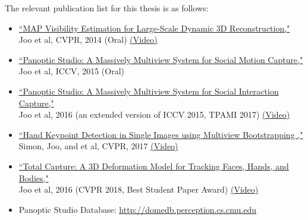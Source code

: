 The relevant publication list for this thesis is as follows: 
\begin{itemize}
	\item  \noindent \href{http://www.cs.cmu.edu/~hanbyulj/14/CVPR_2014_Visibility.pdf}{``MAP Visibility Estimation for Large-Scale Dynamic 3D Reconstruction,"}\\ 
Joo et al, CVPR, 2014 (Oral) \href{https://www.youtube.com/watch?v=LaHTjBWago8}{(Video)}

\item \noindent \href{http://www.cs.cmu.edu/~hanbyulj/panoptic-studio/ICCV2015_SMC.pdf}{``Panoptic Studio: A Massively Multiview System for Social Motion Capture,"}\\ 
Joo et al, ICCV, 2015 (Oral) 

\item \noindent \href{https://ieeexplore.ieee.org/document/8187699}{``Panoptic Studio: A Massively Multiview System for Social Interaction Capture,"}\\ 
Joo et al, 2016 (an extended version of ICCV 2015, TPAMI 2017) \href{https://www.youtube.com/watch?v=m0-7HnWvxG4}{(Video)}

\item \noindent \href{https://arxiv.org/abs/1704.07809}{``Hand Keypoint Detection in Single Images using Multiview Bootstrapping ,"}\\ 
Simon, Joo, and et al, CVPR, 2017 \href{https://www.youtube.com/watch?v=Lajt6vS_dSM}{(Video)}	

\item \noindent \href{http://openaccess.thecvf.com/content_cvpr_2018/papers/Joo_Total_Capture_A_CVPR_2018_paper.pdf}{``Total Capture: A 3D Deformation Model for Tracking Faces, Hands, and Bodies,"}\\ 
Joo et al, 2016 (CVPR 2018, Best Student Paper Award) \href{https://www.youtube.com/watch?v=5QzdXQSf-oY}{(Video)}	

\item \noindent Panoptic Studio Database: \url{http://domedb.perception.cs.cmu.edu}


\end{itemize}

	

